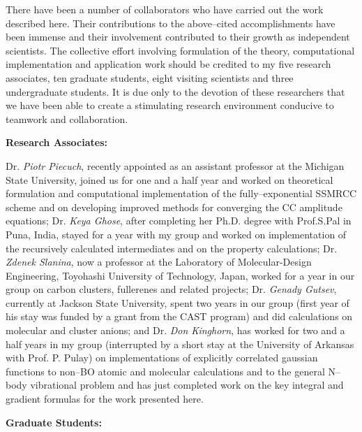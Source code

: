 There have been a number of collaborators who 
have carried out the work described here. Their
contributions to the above--cited accomplishments have 
been immense and their involvement contributed to their
growth as independent scientists. The collective 
effort involving formulation of the theory, computational
implementation and application work should be credited 
to my five research associates, ten graduate students,
eight visiting scientists and three undergraduate students.  
It is due only to the devotion of these researchers that
we have been able to create a stimulating research environment 
conducive to teamwork and collaboration.

\vspace{2mm}

\noindent
{\bf Research Associates:}

Dr. {\em Piotr Piecuch}, recently appointed as an 
assistant professor at the Michigan State University, joined us for
one and a half year and worked on theoretical formulation and 
computational implementation of the fully--exponential
SSMRCC scheme and on developing improved 
methods for converging the CC amplitude equations;  
Dr. {\em Keya Ghose}, 
after completing her Ph.D. degree with Prof.S.Pal in Puna, India,
stayed for a year with my group and 
worked on implementation of the recursively calculated
intermediates and on the property calculations;  
Dr. {\em  Zdenek Slanina}, 
now a professor at the Laboratory
of Molecular-Design Engineering,
Toyohashi University of Technology, Japan,
worked for a year in our group on carbon clusters, fullerenes and
related projects;  
Dr. {\em Genady Gutsev}, 
currently
at Jackson State University, 
spent two years in our group (first year of his stay was
funded by a grant from the CAST program) and did 
calculations on molecular and cluster anions; 
and Dr. {\em Don Kinghorn}, 
has worked for two and a half years in my group
(interrupted by
a short stay at the University of Arkansas with Prof. P. Pulay) 
on implementations of explicitly correlated gaussian functions
to non--BO atomic and molecular calculations and 
to the general N--body vibrational problem and has just completed
work on the key integral and gradient formulas for the work 
presented here.

\vspace{2mm}

\noindent
{\bf Graduate Students:}

